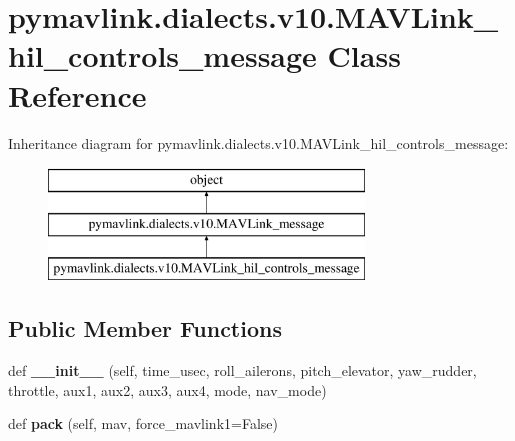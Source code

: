 \hypertarget{classpymavlink_1_1dialects_1_1v10_1_1MAVLink__hil__controls__message}{}\section{pymavlink.\+dialects.\+v10.\+M\+A\+V\+Link\+\_\+hil\+\_\+controls\+\_\+message Class Reference}
\label{classpymavlink_1_1dialects_1_1v10_1_1MAVLink__hil__controls__message}
Inheritance diagram for pymavlink.\+dialects.\+v10.\+M\+A\+V\+Link\+\_\+hil\+\_\+controls\+\_\+message\+:\begin{figure}[H]
\begin{center}
\leavevmode
\includegraphics[height=3.000000cm]{classpymavlink_1_1dialects_1_1v10_1_1MAVLink__hil__controls__message}
\end{center}
\end{figure}
\subsection*{Public Member Functions}
\begin{DoxyCompactItemize}
\item 
\mbox{\label{classpymavlink_1_1dialects_1_1v10_1_1MAVLink__hil__controls__message_ace0a7a3587c3114dbaac9d12e122b9c4}} 
def {\bfseries \+\_\+\+\_\+init\+\_\+\+\_\+} (self, time\+\_\+usec, roll\+\_\+ailerons, pitch\+\_\+elevator, yaw\+\_\+rudder, throttle, aux1, aux2, aux3, aux4, mode, nav\+\_\+mode)
\item 
\mbox{\label{classpymavlink_1_1dialects_1_1v10_1_1MAVLink__hil__controls__message_af167c0b35c1bbd840dada0a02fa54846}} 
def {\bfseries pack} (self, mav, force\+\_\+mavlink1=False)
\end{DoxyCompactItemize}
